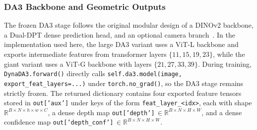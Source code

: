 \subsubsection*{DA3 Backbone and Geometric Outputs}
The frozen DA3 stage follows the original modular design of a DINOv2 backbone, a Dual-DPT dense prediction head, and an optional camera branch~\cite{lin2025da3}. In the implementation used here, the large DA3 variant uses a ViT-L backbone and exports intermediate features from transformer layers $\{11,15,19,23\}$, while the giant variant uses a ViT-G backbone with layers $\{21,27,33,39\}$. During training, \texttt{DynaDA3.forward()} directly calls \texttt{self.da3.model(image, export\_feat\_layers=...)} under \texttt{torch.no\_grad()}, so the DA3 stage remains strictly frozen. The returned dictionary contains four exported feature tensors stored in \texttt{out['aux']} under keys of the form \texttt{feat\_layer\_<idx>}, each with shape $\mathbb{R}^{B\times N\times h\times w\times C}$, a dense depth map \texttt{out['depth']}\,$\in\mathbb{R}^{B\times N\times H\times W}$, and a dense confidence map \texttt{out['depth\_conf']}\,$\in\mathbb{R}^{B\times N\times H\times W}$.


